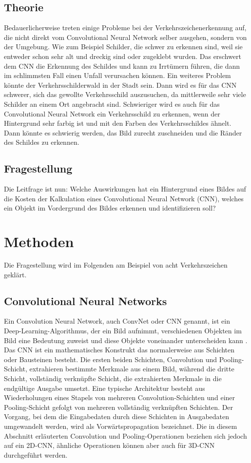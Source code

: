 \documentclass[paper=A4,pagesize=auto,12pt,headinclude=true,footinclude=true,BCOR=0mm,DIV=calc]{scrartcl}
\begin{document}
\subsection{Theorie} %
Bedauerlicherweise treten einige Probleme bei der Verkehrszeichenerkennung auf, die nicht direkt vom Convolutional Neural Network selber ausgehen, sondern von der Umgebung. Wie zum Beispiel Schilder, die schwer zu erkennen sind, weil sie entweder schon sehr alt und dreckig sind oder zugeklebt wurden. Das erschwert dem CNN die Erkennung des Schildes und kann zu Irrtümern führen, die dann im schlimmsten Fall einen Unfall verursachen können. 
Ein weiteres Problem könnte der Verkehrsschilderwald in der Stadt sein. Dann wird es für das CNN schwerer, sich das gewollte Verkehrsschild auszusuchen, da mittlerweile sehr viele Schilder an einem Ort angebracht sind. Schwieriger wird es auch für das Convolutional Neural Network ein Verkehrsschild zu erkennen, wenn der Hintergrund sehr farbig ist und mit den Farben des Verkehrsschildes ähnelt. Dann könnte es schwierig werden, das Bild zurecht zuschneiden und die Ränder des Schildes zu erkennen.

\subsection{Fragestellung}
Die Leitfrage ist nun: Welche Auswirkungen hat ein Hintergrund eines Bildes auf die Kosten der Kalkulation eines Convolutional Neural Network (CNN), welches ein Objekt im Vordergrund des Bildes erkennen und identifizieren soll?


\section{Methoden}
Die Fragestellung wird im Folgenden am Beispiel von acht Verkehrszeichen geklärt.

\subsection{Convolutional Neural Networks} %
Ein Convolution Neural Network, auch ConvNet oder CNN genannt, ist ein Deep-Learning-Algorithmus, der ein Bild aufnimmt, verschiedenen Objekten im Bild eine Bedeutung zuweist und diese Objekte voneinander unterscheiden kann \cite{cnn1}. Das CNN ist ein mathematisches Konstrukt das normalerweise aus Schichten oder Bausteinen besteht. Die ersten beiden Schichten, Convolution und Pooling-Schicht, extrahieren bestimmte Merkmale aus einem Bild, während die dritte Schicht, vollständig verknüpfte Schicht, die extrahierten Merkmale in die endgültige Ausgabe umsetzt. Eine typische Architektur besteht aus Wiederholungen eines Stapels von mehreren Convolution-Schichten und einer Pooling-Schicht gefolgt von mehreren vollständig verknüpften Schichten. Der Vorgang, bei dem die Eingabedaten durch diese Schichten in Ausgabedaten umgewandelt werden, wird als Vorwärtspropagation bezeichnet. Die in diesem Abschnitt erläuterten Convolution und Pooling-Operationen beziehen sich jedoch auf ein 2D-CNN, ähnliche Operationen können aber auch für 3D-CNN durchgeführt werden.\cite{cnn2}
\end{document}
